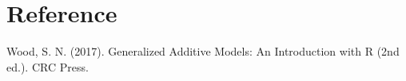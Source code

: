 \section{Reference}
Wood, S. N. (2017). Generalized Additive Models: An Introduction with R (2nd ed.). CRC Press.
